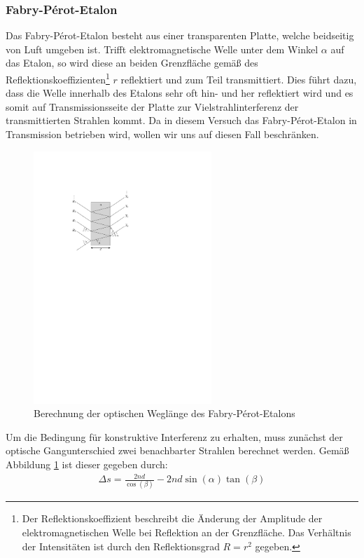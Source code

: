 \documentclass[11pt, a4paper]{article}
\begin{document}
\subsubsection{Fabry-Pérot-Etalon}
Das Fabry-Pérot-Etalon besteht aus einer transparenten Platte, welche beidseitig von Luft umgeben ist.
Trifft elektromagnetische Welle unter dem Winkel $\alpha$ auf das Etalon, so wird diese an beiden Grenzfläche gemäß des Reflektionskoeffizienten\footnote{Der Reflektionskoeffizient beschreibt die Änderung der Amplitude der elektromagnetischen Welle bei Reflektion an der Grenzfläche. Das Verhältnis der Intensitäten ist durch den Reflektionsgrad $R = r^2$ gegeben.} $r$ reflektiert und zum Teil transmittiert.
Dies führt dazu, dass die Welle innerhalb des Etalons sehr oft hin- und her reflektiert wird und es somit auf Transmissionsseite der Platte zur Vielstrahlinterferenz der transmittierten Strahlen kommt.
Da in diesem Versuch das Fabry-Pérot-Etalon in Transmission betrieben wird, wollen wir uns auf diesen Fall beschränken.
\begin{figure}[h]
	\centering
	\includegraphics[width=0.6\textwidth]{./figures/fabry_perot.pdf}
	\caption{Berechnung der optischen Weglänge des Fabry-Pérot-Etalons}
	\label{fig:fabry_perot}
\end{figure}
Um die Bedingung für konstruktive Interferenz zu erhalten, muss zunächst der optische Gangunterschied zwei benachbarter Strahlen berechnet werden.
Gemäß Abbildung \ref{fig:fabry_perot} ist dieser gegeben durch:
\begin{align}
	\Delta s = \frac{2 n d}{\cos(\beta)} - 2 n d \sin(\alpha) \tan(\beta)
\end{align}
\end{document}
